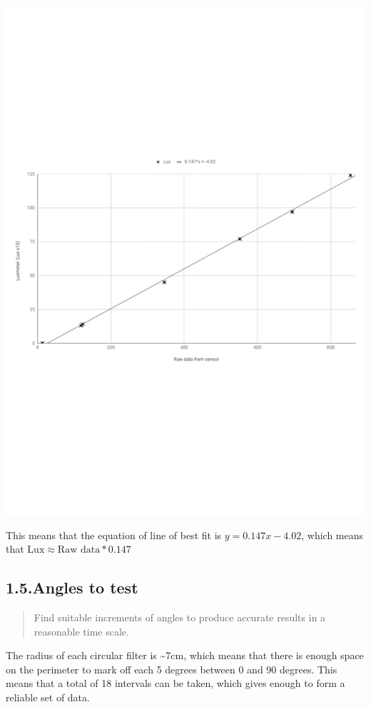 \documentclass{article}
\begin{document}
\includegraphics[keepaspectratio=true,width=\dimmin{}{\dimwidth{0.90}}]{images/results}{}%

\noindent{}This means that the equation of line of best fit is $y=0.147x-4.02$, which means that $\text{Lux}\approx\text{Raw data}*0.147$%

\subsection{1.5.\hspace*{0.5em}Angles to test}\label{sec-angles-to-test}%

\begin{quote}%

\noindent{}Find suitable increments of angles to produce accurate results in a reasonable time scale.%
\end{quote}%

\noindent{}The radius of each circular filter is \textasciitilde{}7cm, which means that there is enough space on the perimeter to mark off each 5 degrees between 0 and 90 degrees. This means that a total of 18 intervals can be taken, which gives enough to form a reliable set of data.%
\end{document}
